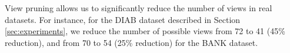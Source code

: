 View pruning allows us to significantly reduce the number of views in real
datasets. 
For instance, for the DIAB dataset described in Section \ref{sec:experiments},
we reduce the number of possible views from 72 to 41 (45\% reduction), and from
70 to 54 (25\% reduction) for the BANK dataset. 






